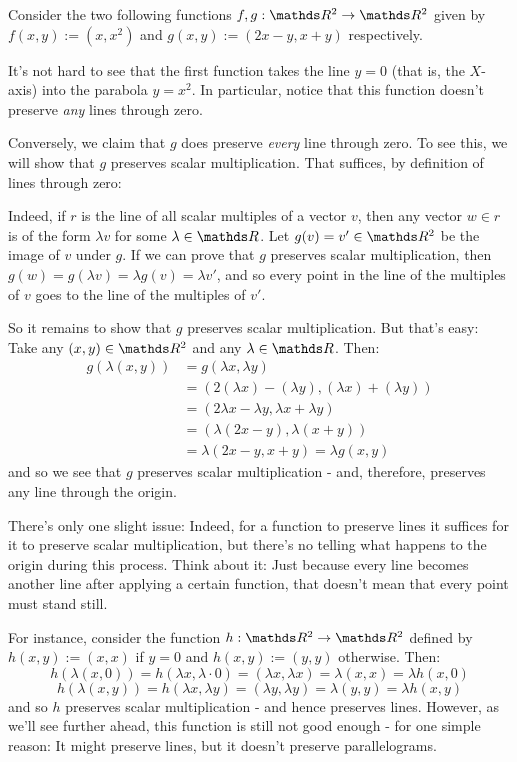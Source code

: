 \begin{ex}
	Consider the two following functions $f,g:\R^2\to\R^2$ given by $f(x,y):=(x,x^2)$ and $g(x,y):=(2x-y,x+y)$ respectively.
	
	It's not hard to see that the first function takes the line $y=0$ (that is, the $X$-axis) into the parabola $y=x^2$. In particular, notice that this function doesn't preserve \textit{any} lines through zero.
	
	Conversely, we claim that $g$ does preserve \textit{every} line through zero. To see this, we will show that $g$ preserves scalar multiplication. That suffices, by definition of lines through zero:
	
	Indeed, if $r$ is the line of all scalar multiples of a vector $v$, then any vector $w\in r$ is of the form $\lambda v$ for some $\lambda \in \R$. Let $g(v)=v'\in\R^2$ be the image of $v$ under $g$. If we can prove that $g$ preserves scalar multiplication, then $g(w)=g(\lambda v)=\lambda g(v)=\lambda v'$, and so every point in the line of the multiples of $v$ goes to the line of the multiples of $v'$.
	
	So it remains to show that $g$ preserves scalar multiplication. But that's easy: Take any $(x,y)\in \R^2$ and any $\lambda\in\R$. Then:
	\begin{align*}
		g(\lambda(x,y))&=g(\lambda x,\lambda y)\\
		&=(2(\lambda x)-(\lambda y),(\lambda x)+(\lambda y))\\
		&=(2\lambda x-\lambda y,\lambda x+\lambda y)\\
		&=(\lambda(2x-y),\lambda(x+y))\\
		&=\lambda(2x-y,x+y)=\lambda g(x,y)
	\end{align*}and so we see that $g$ preserves scalar multiplication - and, therefore, preserves any line through the origin.
	
	\bigskip
	There's only one slight issue: Indeed, for a function to preserve lines it suffices for it to preserve scalar multiplication, but there's no telling what happens to the origin during this process. Think about it: Just because every line becomes another line after applying a certain function, that doesn't mean that every point must stand still.
	
	For instance, consider the function $h:\R^2\to\R^2$ defined by $h(x,y):=(x,x)$ if $y=0$ and $h(x,y):=(y,y)$ otherwise. Then:
	\[h(\lambda(x,0))=h(\lambda x,\lambda\cdot0)=(\lambda x,\lambda x)=\lambda(x,x)=\lambda h(x,0)\]
	\[h(\lambda(x,y))=h(\lambda x,\lambda y)=(\lambda y,\lambda y)=\lambda(y,y)=\lambda h(x,y)\]and so $h$ preserves scalar multiplication - and hence preserves lines. However, as we'll see further ahead, this function is still not good enough - for one simple reason: It might preserve lines, but it doesn't preserve parallelograms.
\end{ex}

